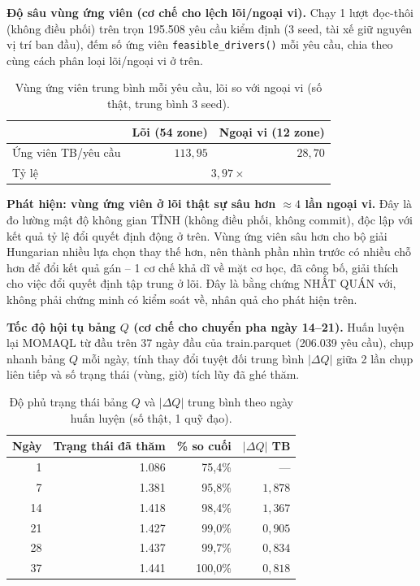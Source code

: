 \documentclass[10pt,twocolumn,a4paper]{article}
\begin{document}
\textbf{Độ sâu vùng ứng viên (cơ chế cho lệch lõi/ngoại vi).} Chạy 1 lượt
đọc-thôi (không điều phối) trên trọn 195.508 yêu cầu kiểm định (3 seed, tài
xế giữ nguyên vị trí ban đầu), đếm số ứng viên \texttt{feasible\_drivers()}
mỗi yêu cầu, chia theo cùng cách phân loại lõi/ngoại vi ở trên.

\begin{table}[h!]
\centering
\caption{Vùng ứng viên trung bình mỗi yêu cầu, lõi so với ngoại vi (số thật, trung bình 3 seed).}
\label{tab:poolseed}
\footnotesize
\begin{tabular}{@{}lrr@{}}
\toprule
& Lõi (54 zone) & Ngoại vi (12 zone) \\
\midrule
Ứng viên TB/yêu cầu & $113,95$ & $28,70$ \\
Tỷ lệ & \multicolumn{2}{c}{$3,97\times$} \\
\bottomrule
\end{tabular}
\end{table}

\textbf{Phát hiện: vùng ứng viên ở lõi thật sự sâu hơn $\approx4$ lần
ngoại vi.} Đây là đo lường mật độ không gian TĨNH (không điều phối, không
commit), độc lập với kết quả tỷ lệ đổi quyết định động ở trên. Vùng ứng
viên sâu hơn cho bộ giải Hungarian nhiều lựa chọn thay thế hơn, nên thành
phần nhìn trước có nhiều chỗ hơn để đổi kết quả gán -- 1 cơ chế khả dĩ về
mặt cơ học, đã công bố, giải thích cho việc đổi quyết định tập trung ở lõi.
Đây là bằng chứng NHẤT QUÁN với, không phải chứng minh có kiểm soát về,
nhân quả cho phát hiện trên.

\textbf{Tốc độ hội tụ bảng $Q$ (cơ chế cho chuyển pha ngày 14--21).} Huấn
luyện lại MOMAQL từ đầu trên 37 ngày đầu của train.parquet (206.039 yêu
cầu), chụp nhanh bảng $Q$ mỗi ngày, tính thay đổi tuyệt đối trung bình
$|\Delta Q|$ giữa 2 lần chụp liên tiếp và số trạng thái (vùng, giờ) tích
lũy đã ghé thăm.

\begin{table}[h!]
\centering
\caption{Độ phủ trạng thái bảng $Q$ và $|\Delta Q|$ trung bình theo ngày huấn luyện (số thật, 1 quỹ đạo).}
\label{tab:qconv}
\footnotesize
\begin{tabular}{@{}rrrr@{}}
\toprule
Ngày & Trạng thái đã thăm & \% so cuối & $|\Delta Q|$ TB \\
\midrule
1  & 1.086 & 75,4\% & --- \\
7  & 1.381 & 95,8\% & $1,878$ \\
14 & 1.418 & 98,4\% & $1,367$ \\
21 & 1.427 & 99,0\% & $0,905$ \\
28 & 1.437 & 99,7\% & $0,834$ \\
37 & 1.441 & 100,0\% & $0,818$ \\
\bottomrule
\end{tabular}
\end{table}
\end{document}
